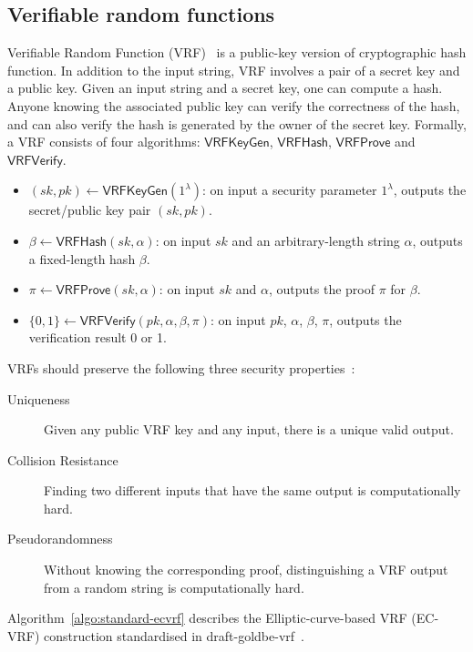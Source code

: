 \subsection{Verifiable random functions}

Verifiable Random Function (VRF)~\cite{micali1999verifiable} is a public-key version of cryptographic hash function.
In addition to the input string, VRF involves a pair of a secret key and a public key.
Given an input string and a secret key, one can compute a hash.
Anyone knowing the associated public key can verify the correctness of the hash, and can also verify the hash is generated by the owner of the secret key.
Formally, a VRF consists of four algorithms: $\mathsf{VRFKeyGen}$, $\mathsf{VRFHash}$, $\mathsf{VRFProve}$ and $\mathsf{VRFVerify}$.

\begin{itemize}
    \item $(sk, pk) \gets \mathsf{VRFKeyGen}(1^{\lambda})$: on input a security parameter $1^{\lambda}$, outputs the secret/public key pair $(sk, pk)$.
    \item $\beta \gets \mathsf{VRFHash}(sk, \alpha)$: on input $sk$ and an arbitrary-length string $\alpha$, outputs a fixed-length hash $\beta$.
    \item $\pi \gets \mathsf{VRFProve}(sk, \alpha)$: on input $sk$ and $\alpha$, outputs the proof $\pi$ for $\beta$.
    \item $\{0, 1\} \gets \mathsf{VRFVerify}(pk, \alpha, \beta, \pi)$: on input $pk$, $\alpha$, $\beta$, $\pi$, outputs the verification result 0 or 1.
\end{itemize}

VRFs should preserve the following three security properties~\cite{goldberg2017draft}:

\begin{description}
    \item[Uniqueness] Given any public VRF key and any input, there is a unique valid output.
    \item[Collision Resistance] Finding two different inputs that have the same output is computationally hard.
    \item[Pseudorandomness] Without knowing the corresponding proof, distinguishing a VRF output from a random string is computationally hard.
\end{description}


Algorithm~\ref{algo:standard-ecvrf} describes the Elliptic-curve-based VRF (EC-VRF) construction standardised in draft-goldbe-vrf~\cite{goldberg2017draft}.

